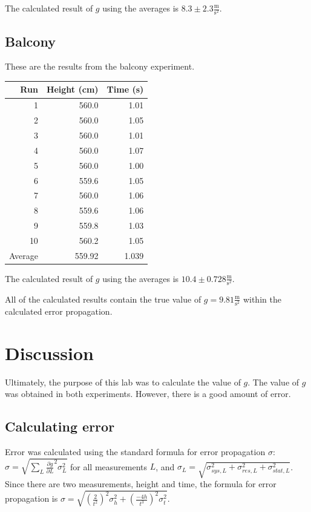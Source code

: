\documentclass[12pt]{article}
\begin{document}
The calculated result of \(g\) using the averages is \(8.3\pm2.3 \frac{\text{m}}{\text{s}^{2}}\).
\subsection{Balcony}
\label{sec:org20ca5a3}

These are the results from the balcony experiment.

\begin{center}
\begin{tabular}{r|r|r}
Run & Height (cm) & Time (s)\\
\hline
1 & 560.0 & 1.01\\
2 & 560.0 & 1.05\\
3 & 560.0 & 1.01\\
4 & 560.0 & 1.07\\
5 & 560.0 & 1.00\\
6 & 559.6 & 1.05\\
7 & 560.0 & 1.06\\
8 & 559.6 & 1.06\\
9 & 559.8 & 1.03\\
10 & 560.2 & 1.05\\
\hline
Average & 559.92 & 1.039\\
\end{tabular}
\end{center}

The calculated result of \(g\) using the averages is \(10.4\pm 0.728 \frac{\text{m}}{\text{s}^{2}}\).

All of the calculated results contain the true value of \(g = 9.81 \frac{\text{m}}{\text{s}^{2}}\) within the calculated error propagation.
\section{Discussion}
\label{sec:org0d1f0c8}

Ultimately, the purpose of this lab was to calculate the value of \(g\). The value of \(g\) was obtained in both experiments. However, there is a good amount of error.
\subsection{Calculating error}
\label{sec:org7d98e2e}

Error was calculated using the standard formula for error propagation \(\sigma\): \(\sigma = \sqrt{\sum_{L} \frac{\partial g}{\partial L}^{2}\sigma_{L}^{2}}\) for all measurements \(L\), and \(\sigma_{L}=\sqrt{\sigma_{sys,L}^{2}+\sigma_{res,L}^{2}+\sigma_{stat,L}^{2}}\). Since there are two measurements, height and time, the formula for error propagation is \(\sigma = \sqrt{ \left( \frac{2}{t^{2}} \right) ^{2} \sigma_{h}^{2} + \left( \frac{-4h}{t^{3}} \right)^{2}\sigma_{t}^{2} }\).
\end{document}
